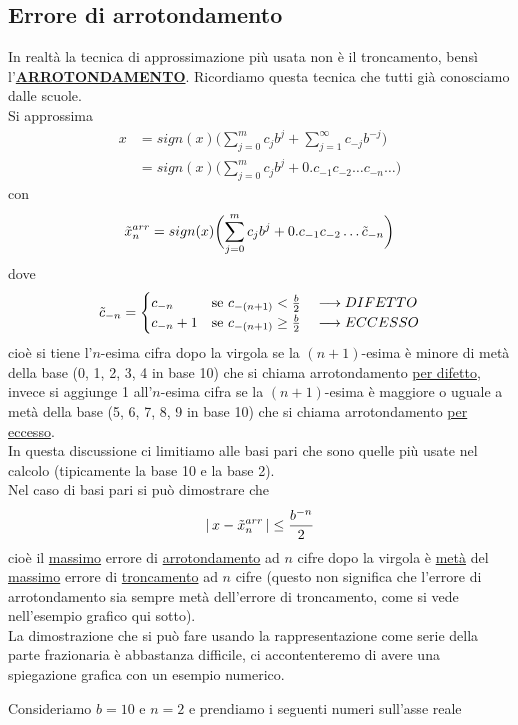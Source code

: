 \subsection{Errore di arrotondamento}
In realtà la tecnica di approssimazione più usata non è il troncamento, bensì l'\uline{\textbf{ARROTONDAMENTO}}. Ricordiamo questa tecnica che tutti già conosciamo dalle scuole. \\
Si approssima 
\[ \begin{split}
    x & = sign(x)\biggl( \sum_{j=0}^m c_j b^j + \sum_{j=1}^\infty c_{-j} b^{-j} \biggr) \\
    & = sign(x) \biggl( \sum_{j=0}^m c_j b^j + 0.c_{-1}c_{-2} \dotsc c_{-n} \dotsc \biggr) 
\end{split} \]
con \[ \Tilde{x}_n^{arr} = sign(x) \biggl( \sum_{j=0}^m c_j b^j + 0.c_{-1}c_{-2} \dotsc \Tilde{c}_{-n} \biggr) \]
dove \[\Tilde{c}_{-n} = 
\begin{cases}
    c_{-n} & \text{se $c_{-(n+1)} < \frac{b}{2} \quad \longrightarrow DIFETTO$} \\
    c_{-n}+1 & \text{se $c_{-(n+1)} \ge \frac{b}{2} \quad \longrightarrow ECCESSO$}
\end{cases}
\]
cioè si tiene l'$n$-esima cifra dopo la virgola se la $(n+1)$-esima è minore di metà della base (0, 1, 2, 3, 4 in base 10) che si chiama arrotondamento \uline{per difetto}, invece si aggiunge 1 all'$n$-esima cifra se la $(n+1)$-esima è maggiore o uguale a metà della base (5, 6, 7, 8, 9 in base 10) che si chiama arrotondamento \uline{per eccesso}.\\
In questa discussione ci limitiamo alle basi pari che sono quelle più usate nel calcolo (tipicamente la base 10 e la base 2). \\
Nel caso di basi pari si può dimostrare che
\[ \lvert \, x - \Tilde{x}_n^{arr} \,\rvert \le \frac{b^{-n}}{2}\]
cioè il \uline{massimo} errore di \uline{arrotondamento} ad $n$ cifre dopo la virgola è \uline{metà} del \uline{massimo} errore di \uline{troncamento} ad $n$ cifre (questo non significa che l'errore di arrotondamento sia sempre metà dell'errore di troncamento, come si vede nell'esempio grafico qui sotto).\\
La dimostrazione che si può fare usando la rappresentazione come serie della parte frazionaria è abbastanza difficile, ci accontenteremo di avere una spiegazione grafica con un esempio numerico.
\begin{esempio} \end{esempio}
Consideriamo $b=10$ e $n=2$ e prendiamo i seguenti numeri sull'asse reale 
